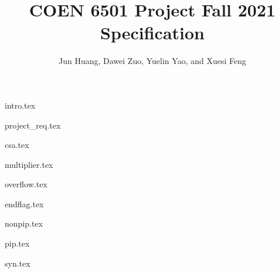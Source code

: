 \documentclass[stu, floatsintext, 10pt, donotrepeattitle, natbib]{apa7}
\title{COEN 6501 Project Fall 2021 Specification}
\author{Jun Huang, Dawei Zuo, Yuelin Yao, and Xuesi Feng}
\begin{document}
\maketitle

\renewcommand\contentsname{Table of Conetnts}
\tableofcontents
\setcounter{tocdepth}{5}

\newpage
\renewcommand{\listfigurename}{List of Figures}
\listoffigures
\newpage
\renewcommand{\listtablename}{List of Tables}
\listoftables


\newpage
{intro.tex}

\newpage
{project_req.tex}

\newpage
{csa.tex}

\newpage
{multiplier.tex}

\newpage
{overflow.tex}

\newpage
{endflag.tex}

\newpage
{nonpip.tex}

\newpage
{pip.tex}

\newpage
{syn.tex}

\newpage
\renewcommand\refname{\textbf{References}}

\end{document}
